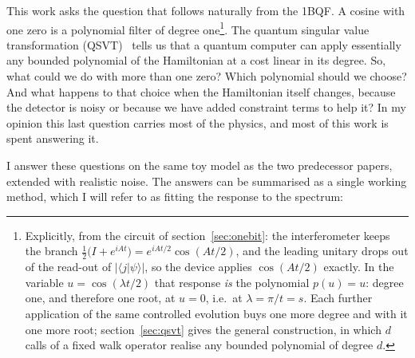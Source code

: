 \documentclass[11pt,a4paper]{article}
\begin{document}
This work asks the question that follows naturally from the 1BQF. A
cosine with one zero is a polynomial filter of degree
one\footnote{Explicitly, from the circuit of
section~\ref{sec:onebit}: the interferometer keeps the branch
$\tfrac12\big(I+e^{iAt}\big)=e^{iAt/2}\cos(At/2)$, and the leading
unitary drops out of the read-out of $|\langle j|\psi\rangle|$, so the
device applies $\cos(At/2)$ exactly. In the variable
$u=\cos(\lambda t/2)$ that response \emph{is} the polynomial
$p(u)=u$: degree one, and therefore one root, at $u=0$, i.e.\ at
$\lambda=\pi/t=s$. Each further application of the same controlled
evolution buys one more degree and with it one more root;
section~\ref{sec:qsvt} gives the general construction, in which $d$
calls of a fixed walk operator realise any bounded polynomial of
degree $d$.}. The quantum singular value transformation
(QSVT)~\cite{gslw2019,martyn2021} tells us that a quantum computer can
apply essentially any bounded polynomial of the Hamiltonian at a cost
linear in its degree. So, what could we do with more than one zero? Which
polynomial should we choose? And what happens to that choice when the
Hamiltonian itself changes, because the detector is noisy or because we
have added constraint terms to help it? In my opinion this last question
carries most of the physics, and most of this work is spent answering
it.

I answer these questions on the same toy model as the two predecessor
papers, extended with realistic noise. The answers can be summarised as a
single working method, which I will refer to as fitting the response to
the spectrum:
\end{document}
